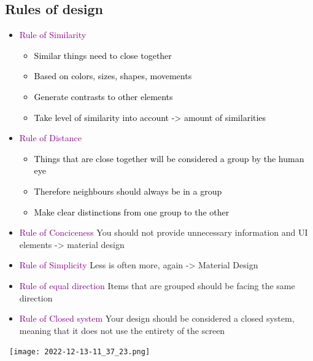 \documentclass[main.tex,fontsize=6pt,paper=a4,paper=landscape,DIV=calc,]{scrartcl}
\begin{document}
\begin{multicols*}{4}
\subsection{Rules of design}  
\begin{itemize}
\item \textcolor{purple}{Rule of Similarity}\newline
  \begin{itemize}
  \item \textcolor{black}{Similar things need to close together}
  \item \textcolor{black}{Based on colors, sizes, shapes, movements}
  \item \textcolor{black}{Generate contrasts to other elements}
  \item \textcolor{black}{Take level of similarity into account -> amount of similarities}
  \end{itemize} 
\item \textcolor{purple}{Rule of Distance}\newline
  \begin{itemize}
  \item \textcolor{black}{Things that are close together will be considered a group by the human eye}
  \item \textcolor{black}{Therefore neighbours should always be in a group}
  \item \textcolor{black}{Make clear distinctions from one group to the other}
  \end{itemize} 
\item \textcolor{purple}{Rule of Conciceness}\newline
  You should not provide unnecessary information and UI elements -> material design
\item \textcolor{purple}{Rule of Simplicity}\newline
  Less is often more, again -> Material Design
\item \textcolor{purple}{Rule of equal direction}\newline
  Items that are grouped should be facing the same direction
\item \textcolor{purple}{Rule of Closed system}\newline
Your design should be considered a closed system, meaning that it does not use the entirety of the screen
\end{itemize}
\, \newline
\texttt{[image: 2022-12-13-11\_37\_23.png]}


\end{multicols*}
\end{document}
